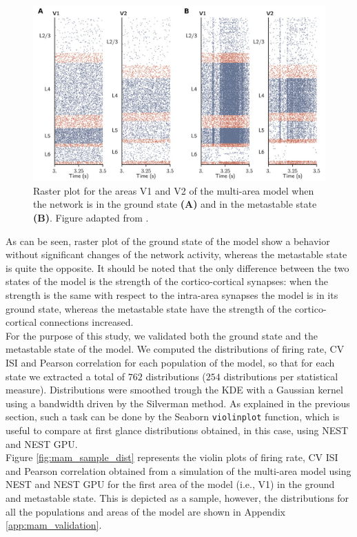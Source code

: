 \documentclass[a4paper, 12pt, twoside, openright]{book}
\begin{document}
\begin{figure}[H]
    \centering
    \includegraphics[width=\columnwidth]{figures/raster_plot_mam.jpg}
    \caption{Raster plot for the areas V1 and V2 of the multi-area model when the network is in the ground state \textbf{(A)} and in the metastable state \textbf{(B)}. Figure adapted from \cite{Tiddia2022}.}
    \label{fig:raster_plot_mam}
\end{figure}

As can be seen, raster plot of the ground state of the model show a behavior without significant changes of the network activity, whereas the metastable state is quite the opposite. It should be noted that the only difference between the two states of the model is the strength of the cortico-cortical synapses: when the strength is the same with respect to the intra-area synapses the model is in its ground state, whereas the metastable state have the strength of the cortico-cortical connections increased.\\
For the purpose of this study, we validated both the ground state and the metastable state of the model. We computed the distributions of firing rate, CV ISI and Pearson correlation for each population of the model, so that for each state we extracted a total of $762$ distributions ($254$ distributions per statistical measure). Distributions were smoothed trough the KDE with a Gaussian kernel using a bandwidth driven by the Silverman method. As explained in the previous section, such a task can be done by the Seaborn \texttt{violinplot} function, which is useful to compare at first glance distributions obtained, in this case, using NEST and NEST GPU.\\
Figure \ref{fig:mam_sample_dist} represents the violin plots of firing rate, CV ISI and Pearson correlation obtained from a simulation of the multi-area model using NEST and NEST GPU for the first area of the model (i.e., V1) in the ground and metastable state. This is depicted as a sample, however, the distributions for all the populations and areas of the model are shown in Appendix \ref{app:mam_validation}.
\end{document}
